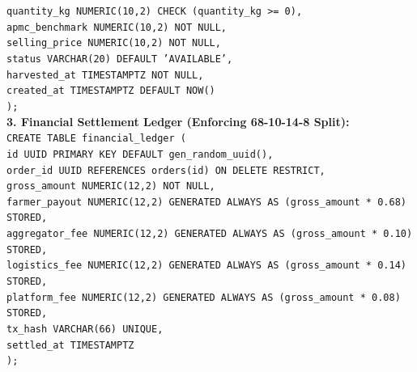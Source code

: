 {\begin{singlespace}
\hspace*{0.6cm}\texttt{quantity\_kg NUMERIC(10,2) CHECK (quantity\_kg >= 0),}\\
\hspace*{0.6cm}\texttt{apmc\_benchmark NUMERIC(10,2) NOT NULL,}\\
\hspace*{0.6cm}\texttt{selling\_price NUMERIC(10,2) NOT NULL,}\\
\hspace*{0.6cm}\texttt{status VARCHAR(20) DEFAULT 'AVAILABLE',}\\
\hspace*{0.6cm}\texttt{harvested\_at TIMESTAMPTZ NOT NULL,}\\
\hspace*{0.6cm}\texttt{created\_at TIMESTAMPTZ DEFAULT NOW()}\\
\texttt{);}\\[0.3cm]
\noindent\textbf{3. Financial Settlement Ledger (Enforcing 68-10-14-8 Split):}\\
\texttt{CREATE TABLE financial\_ledger (}\\
\hspace*{0.6cm}\texttt{id UUID PRIMARY KEY DEFAULT gen\_random\_uuid(),}\\
\hspace*{0.6cm}\texttt{order\_id UUID REFERENCES orders(id) ON DELETE RESTRICT,}\\
\hspace*{0.6cm}\texttt{gross\_amount NUMERIC(12,2) NOT NULL,}\\
\hspace*{0.6cm}\texttt{farmer\_payout NUMERIC(12,2) GENERATED ALWAYS AS (gross\_amount * 0.68) STORED,}\\
\hspace*{0.6cm}\texttt{aggregator\_fee NUMERIC(12,2) GENERATED ALWAYS AS (gross\_amount * 0.10) STORED,}\\
\hspace*{0.6cm}\texttt{logistics\_fee NUMERIC(12,2) GENERATED ALWAYS AS (gross\_amount * 0.14) STORED,}\\
\hspace*{0.6cm}\texttt{platform\_fee NUMERIC(12,2) GENERATED ALWAYS AS (gross\_amount * 0.08) STORED,}\\
\hspace*{0.6cm}\texttt{tx\_hash VARCHAR(66) UNIQUE,}\\
\hspace*{0.6cm}\texttt{settled\_at TIMESTAMPTZ}\\
\texttt{);}\\
\end{singlespace}
\vspace{0.3cm}

}
